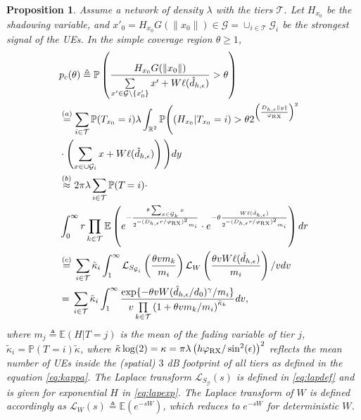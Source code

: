 \documentclass[conference]{IEEEtran}
\newcommand{\R}{\mathbb{R}}
\theoremstyle{definition}
\theoremstyle{plain}
\newtheorem{prop}[thm4]{Proposition}
\begin{document}
            
          \begin{prop}
            Assume a network of density $\lambda$ with the tiers $\mathcal{T}$. Let $H_{x_0}$ be the shadowing variable, and ${x'}_0 =  H_{x_0}G(\|x_0\|) \in \mathcal{G} =\cup_{i \in \mathcal{T}} \mathcal{G}_i$ be the strongest signal of the UEs. In the simple coverage region $\theta \geq 1$,
            \begin{align}
              \label{eq:probofcov}
              &p_c(\theta) \triangleq \mathbb{P}\left( \frac{H_{x_0} G(\|x_0\|)}{\sum\limits_{x' \in   \mathcal{G} \setminus \{x'_0\}}x'  + W\ell(\hat{d}_{h,\epsilon})} > \theta \right) \nonumber \\      
              &\overset{(a)}= \sum_{i\in \mathcal{T}} \mathbb{P}(T_{x_0}  = i)\lambda \int_{ \R^2}\mathbb{P}\Bigg((H_{x_0}|T_{x_0} = i) > \theta  2^{\left(\frac{D_{h,\epsilon}\|y\|}{\varphi_{\textup{RX}}}\right)^2 } \nonumber \\
              &\cdot \left(\sum_{x \in \cup\mathcal{G}_i }x +W\ell(\hat{d}_{h,\epsilon}) \right)\Bigg) \nonumber dy  \nonumber  \\              
              &\overset{(b)}{\approx} 2 \pi \lambda\sum_{i\in \mathcal{T}} \mathbb{P}(T_{}  = i) \cdot \nonumber \\
              &\int_{0}^{\infty} r \prod_{k \in \mathcal{T}}\mathbb{E} \left(e^{-\frac{\theta \sum_{x \in { \mathcal{G}_k}} x}{2^{-(D_{h,\epsilon}r/\varphi_{\textup{RX}})^2} m_i  }} \cdot e^{- \theta   \frac{W\ell(\hat{d}_{h,\epsilon})}{2^{-(D_{h,\epsilon}r/\varphi_{\textup{RX}})^2} m_i}} \right) dr \nonumber \\
              &\overset{(c)}{=}   {} \sum_{i \in \mathcal{T}}\tilde{\kappa}_i\int_1^{\infty} \mathcal{L}_{S_{\mathcal{G}_i}}\left(\frac{\theta v  m_k}{m_i} \right)  \mathcal{L}_{W}\left( \frac{\theta vW\ell(\hat{d}_{h,\epsilon})}{m_i} \right)/v dv \nonumber \\
              &\overset{}{=}   {} \sum_{i \in \mathcal{T}} \tilde{\kappa}_i\int_1^{\infty}  \frac{\exp \{- \theta v W(\hat{d}_{h,\epsilon}/d_0)^{\gamma}/m_i \}}{v\prod\limits_{k \in \mathcal{T}}\left(1 + \theta v  m_k/m_i\right)^{\tilde{\kappa}_k}} dv,
            \end{align}
            where $m_j \triangleq \mathbb{E}(H| T = j)$ is the mean of the fading variable of tier $j$, $\tilde{\kappa}_i =\mathbb{P}(T_{}  = i) {\tilde{\kappa}}$, where $   \tilde{\kappa}\log(2)= \kappa=\pi \lambda   \left(h \varphi_{\textup{RX}}/\sin^2(\epsilon) \right)^2$ reflects the mean number of UEs inside the (spatial) $3$ dB footprint of all tiers as defined in the equation \eqref{eq:kappa}. The Laplace transform $\mathcal{L}_{S_\mathcal{G}}(s)$ is defined in \eqref{eq:lapdef} and is given for exponential $H$ in \eqref{eq:lapexp}. The Laplace transform of $W$ is defined accordingly as $\mathcal{L}_W(s) \triangleq \mathbb{E}\left(e^{-sW} \right)$, which reduces to $e^{-sW}$ for deterministic $W$.

\end{prop}
\end{document}
